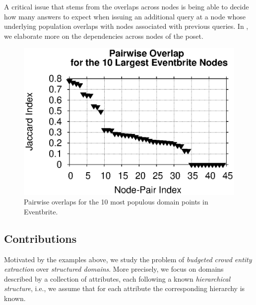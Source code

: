 A critical issue that stems from the overlaps across nodes is being able to decide how many answers to expect when issuing an additional query at a node whose underlying population overlaps with nodes associated with previous queries. In , we elaborate more on the dependencies across nodes of the poset.

\begin{figure}
	\begin{center}
	\includegraphics[clip,scale=0.5]{figs/overlaps.eps}
	\caption{Pairwise overlaps for the 10 most populous domain points in Eventbrite.}
	\label{fig:eventbriteover}
	\vspace{-20pt}
	\end{center}
\end{figure}

\subsection{Contributions}
\label{sec:contributions}
Motivated by the examples above, we study the problem of {\em budgeted crowd entity extraction} over {\em structured domains}. More precisely, we focus on domains described by a collection of attributes, each following a known {\em hierarchical structure}, i.e., we assume that for each attribute the corresponding hierarchy is known.

